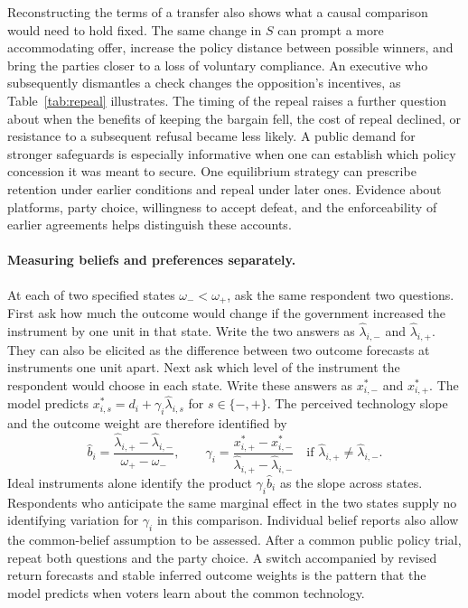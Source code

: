 \documentclass[11pt,letterpaper]{article}
\begin{document}
Reconstructing the terms of a transfer also shows what a causal comparison would need to hold fixed. The same change in $S$ can prompt a more accommodating offer, increase the policy distance between possible winners, and bring the parties closer to a loss of voluntary compliance. An executive who subsequently dismantles a check changes the opposition's incentives, as Table~\ref{tab:repeal} illustrates. The timing of the repeal raises a further question about when the benefits of keeping the bargain fell, the cost of repeal declined, or resistance to a subsequent refusal became less likely. A public demand for stronger safeguards is especially informative when one can establish which policy concession it was meant to secure. One equilibrium strategy can prescribe retention under earlier conditions and repeal under later ones. Evidence about platforms, party choice, willingness to accept defeat, and the enforceability of earlier agreements helps distinguish these accounts.

\paragraph{Measuring beliefs and preferences separately.}
At each of two specified states $\omega_-<\omega_+$, ask the same respondent two questions. First ask how much the outcome would change if the government increased the instrument by one unit in that state. Write the two answers as $\hat\lambda_{i,-}$ and $\hat\lambda_{i,+}$. They can also be elicited as the difference between two outcome forecasts at instruments one unit apart. Next ask which level of the instrument the respondent would choose in each state. Write these answers as $x^*_{i,-}$ and $x^*_{i,+}$. The model predicts $x^*_{i,s}=d_i+\gamma_i\hat\lambda_{i,s}$ for $s\in\{-,+\}$. The perceived technology slope and the outcome weight are therefore identified by
\begin{equation}
 \hat b_i=\frac{\hat\lambda_{i,+}-\hat\lambda_{i,-}}{\omega_+-\omega_-},
 \qquad
 \gamma_i=\frac{x^*_{i,+}-x^*_{i,-}}{\hat\lambda_{i,+}-\hat\lambda_{i,-}}
 \quad\text{if }\hat\lambda_{i,+}\ne\hat\lambda_{i,-}.
 \label{eq:elicitation}
\end{equation}
Ideal instruments alone identify the product $\gamma_i\hat b_i$ as the slope across states. Respondents who anticipate the same marginal effect in the two states supply no identifying variation for $\gamma_i$ in this comparison. Individual belief reports also allow the common-belief assumption to be assessed. After a common public policy trial, repeat both questions and the party choice. A switch accompanied by revised return forecasts and stable inferred outcome weights is the pattern that the model predicts when voters learn about the common technology.
\end{document}
